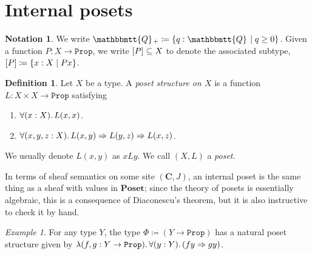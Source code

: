 \documentclass[11pt, oneside, article]{memoir}
\theoremstyle{plain}
\theoremstyle{definition}
\newtheorem{definition}[theorem]{Definition}
\newtheorem{notation}[theorem]{Notation}
\theoremstyle{remark}
\newtheorem{example}[theorem]{Example}
\renewcommand{\ss}{\subseteq}
\DeclarePairedDelimiter{\subtype}{[}{]}
\newcommand{\const}[1]{\mathtt{#1}}
\newcommand{\Cat}[1]{\mathbf{#1}}
\newcommand{\internal}[1]{\raisebox{-.03ex}{$\mathbbmtt{#1}$}}
\newcommand{\hs}{\hspace{1.1pt}}
\newcommand{\tQQ}{\internal{Q}\hs}
\newcommand{\tQQp}{\tQQ_{+}}
\newcommand{\Prop}{\const{Prop}}
\newcommand{\Poset}{\Cat{Poset}}
\renewcommand{\C}{\Cat{C}}
\newcommand{\imp}{\Rightarrow}
\begin{document}
\section{Internal posets}

\begin{notation}
We write $\tQQp\coloneqq\{q:\tQQ\mid q\geq0\}$. Given a function $P:X\to\Prop$, we write $\subtype{P}\ss X$ to denote the associated subtype, $\subtype{P}\coloneqq\{x:X\mid Px\}$.
\end{notation}

\begin{definition}
Let $X$ be a type. A \emph{poset structure on $X$} is a function $L:X\times X\to\Prop$ satisfying
\begin{enumerate}
	\item $\forall(x:X)\ldotp L(x,x)$.
	\item $\forall(x,y,z:X)\ldotp L(x,y)\imp L(y,z)\imp L(x,z)$.
\end{enumerate}
We usually denote $L(x,y)$ as $x L y$. We call $(X,L)$ a \emph{poset}.
\end{definition}

In terms of sheaf semantics on some site $(\C,J)$, an internal poset is the same thing as a sheaf with values in $\Poset$; since the theory of posets is essentially algebraic, this is a consequence of Diaconescu's theorem, but it is also instructive to check it by hand.

\begin{example}
For any type $Y$, the type $\Phi\coloneqq (Y\to\Prop)$ has a natural poset structure given by $\lambda(f,g:Y\to\Prop)\ldotp\forall(y:Y)\ldotp (fy\imp gy)$.
\end{example}
\end{document}
